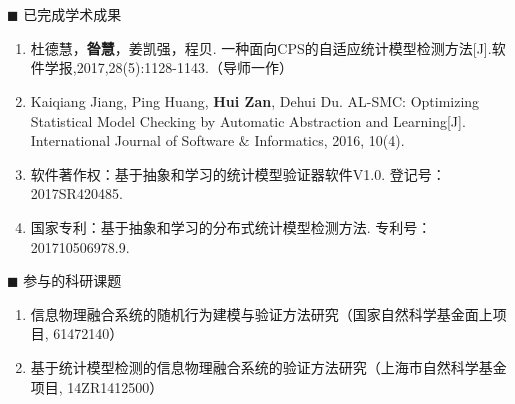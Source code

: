 \newpage
\section*{}
\vskip 2mm
\vspace{-1cm}
\renewcommand{\labelenumi}{[\arabic{enumi}]}
{\heiti $\blacksquare$ 已完成学术成果}\vskip 3mm

\begin{enumerate}
	\item 杜德慧，\textbf{昝慧}，姜凯强，程贝. 一种面向CPS的自适应统计模型检测方法[J].软件学报,2017,28(5):1128-1143.（导师一作）
	\item Kaiqiang Jiang, Ping Huang, \textbf{Hui Zan}, Dehui Du. AL-SMC: Optimizing Statistical Model Checking by Automatic Abstraction and Learning[J]. International Journal of Software $\&$ Informatics, 2016, 10(4).
	\item 软件著作权：基于抽象和学习的统计模型验证器软件V1.0. 登记号：2017SR420485.
	\item 国家专利：基于抽象和学习的分布式统计模型检测方法. 专利号：201710506978.9.
\end{enumerate}


{\heiti $\blacksquare$ 参与的科研课题}\vskip 3mm
\begin{enumerate}
	
	\item
	信息物理融合系统的随机行为建模与验证方法研究（国家自然科学基金面上项目, 61472140）
	
	\item
	基于统计模型检测的信息物理融合系统的验证方法研究（上海市自然科学基金项目, 14ZR1412500）
	
\end{enumerate}